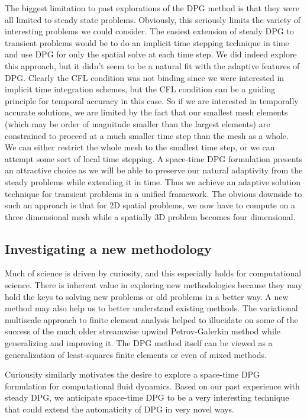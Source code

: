 \documentclass{report}
\begin{document}
The biggest limitation to past explorations of the DPG method is that they were all limited to steady state problems.
Obviously, this seriously limits the variety of interesting problems we could consider. 
The easiest extension of steady DPG to transient problems would be to do an implicit time stepping technique in time and use DPG for only the spatial solve at each time step.
We did indeed explore this approach, but it didn't seem to be a natural fit with the adaptive features of DPG.
Clearly the CFL condition was not binding since we were interested in implicit time integration schemes, but the CFL condition can be a guiding principle for temporal accuracy in this case.
So if we are interested in temporally accurate solutions, we are limited by the fact that our smallest mesh elements (which may be order of magnitude smaller than the largest elements) are constrained to proceed at a much smaller time step than the mesh as a whole. 
We can either restrict the whole mesh to the smallest time step, or we can attempt some sort of local time stepping.
A space-time DPG formulation presents an attractive choice as we will be able to preserve our natural adaptivity from the steady problems while extending it in time.
Thus we achieve an adaptive solution technique for transient problems in a unified framework.
The obvious downside to such an approach is that for 2D spatial problems, we now have to compute on a three dimensional mesh while a spatially 3D problem becomes four dimensional.

\subsection{Investigating a new methodology}
Much of science is driven by curiosity, and this especially holds for computational science. 
There is inherent value in exploring new methodologies because they may hold the keys to solving new problems or old problems in a better way.
A new method may also help us to better understand existing methods. 
The variational multiscale approach to finite element analysis helped to illucidate on some of the success of the much older streamwise upwind Petrov-Galerkin method while generalizing and improving it.
The DPG method itself can be viewed as a generalization of least-squares finite elements or even of mixed methods. 

Curiousity similarly motivates the desire to explore a space-time DPG formulation for computational fluid dynamics. 
Based on our past experience with steady DPG, we anticipate space-time DPG to be a very interesting technique that could extend the automaticity of DPG in very novel ways.
\end{document}

